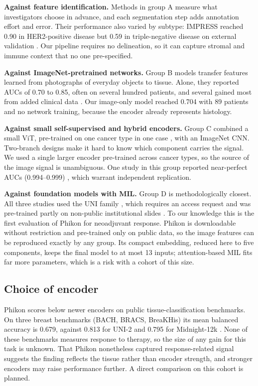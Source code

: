 \documentclass[10pt,a4paper,twocolumn]{article}
\begin{document}
\textbf{Against feature identification.} Methods in group A measure what investigators choose in advance, and each segmentation step adds annotation effort and error. Their performance also varied by subtype: IMPRESS reached 0.90 in HER2-positive disease but 0.59 in triple-negative disease on external validation \cite{huang2023}. Our pipeline requires no delineation, so it can capture stromal and immune context that no one pre-specified.

\textbf{Against ImageNet-pretrained networks.} Group B models transfer features learned from photographs of everyday objects to tissue. Alone, they reported AUCs of 0.70 to 0.85, often on several hundred patients, and several gained most from added clinical data \cite{li2022,zeng2024}. Our image-only model reached 0.704 with 89 patients and no network training, because the encoder already represents histology.

\textbf{Against small self-supervised and hybrid encoders.} Group C combined a small ViT, pre-trained on one cancer type in one case \cite{lin2026}, with an ImageNet CNN. Two-branch designs make it hard to know which component carries the signal. We used a single larger encoder pre-trained across cancer types, so the source of the image signal is unambiguous. One study in this group reported near-perfect AUCs (0.994--0.999) \cite{lin2026}, which warrant independent replication.

\textbf{Against foundation models with MIL.} Group D is methodologically closest. All three studies used the UNI family \cite{khan2025,hou2026,zhou2026}, which requires an access request and was pre-trained partly on non-public institutional slides \cite{chen2024}. To our knowledge this is the first evaluation of Phikon for neoadjuvant response. Phikon is downloadable without restriction and pre-trained only on public data, so the image features can be reproduced exactly by any group. Its compact embedding, reduced here to five components, keeps the final model to at most 13 inputs; attention-based MIL fits far more parameters, which is a risk with a cohort of this size.

\subsection{Choice of encoder}
Phikon scores below newer encoders on public tissue-classification benchmarks. On three breast benchmarks (BACH, BRACS, BreaKHis) its mean balanced accuracy is 0.679, against 0.813 for UNI-2 and 0.795 for Midnight-12k \cite{karasikov2025}. None of these benchmarks measures response to therapy, so the size of any gain for this task is unknown. That Phikon nonetheless captured response-related signal suggests the finding reflects the tissue rather than encoder strength, and stronger encoders may raise performance further. A direct comparison on this cohort is planned.
\end{document}
